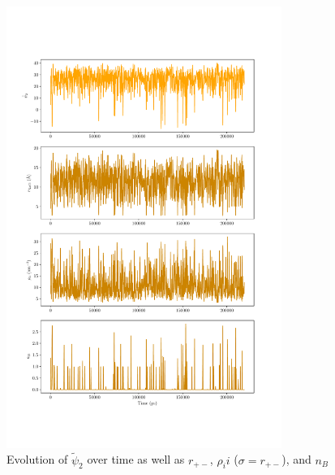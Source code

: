 \begin{spacing}{2.0}
    \begin{figure}[t]
        \centering
        \includegraphics[width=0.8\textwidth]{./figs/fig3-02}
        \caption{Evolution of $\tilde{\psi}_2$ over time as well as $r_{+-}$, $\rho_ii$ ($\sigma = r_{+-}$), and $n_B$}
        \label{fig:time-correlation-psi2}
    \end{figure}


\end{spacing}
